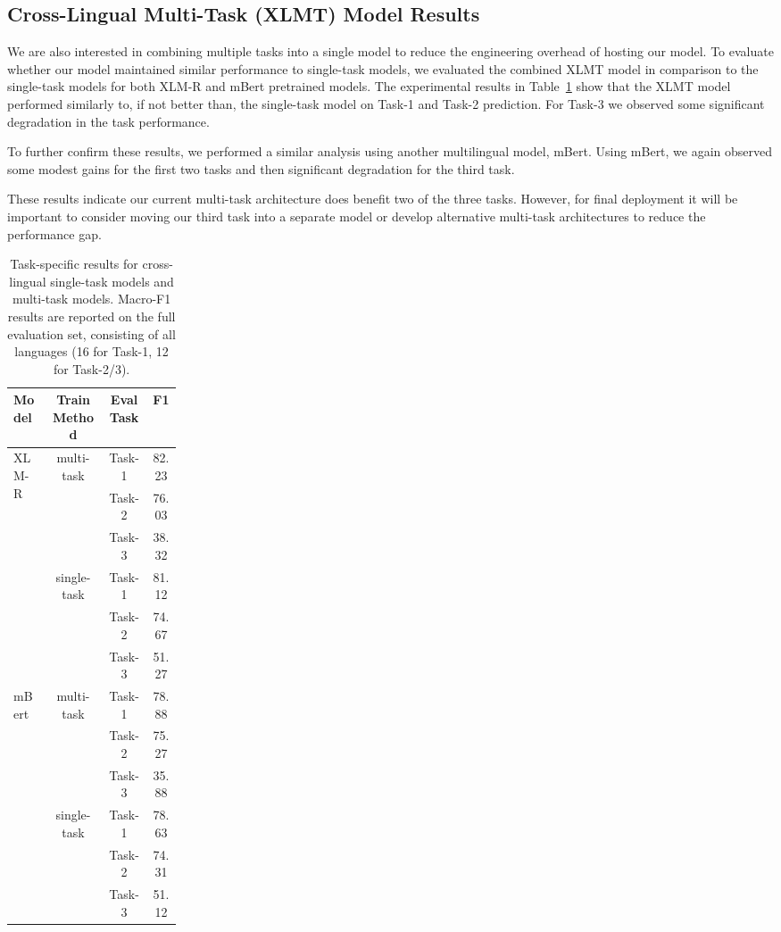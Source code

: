 \subsection*{Cross-Lingual Multi-Task (XLMT) Model Results}
We are also interested in combining multiple tasks into a single model to reduce the engineering overhead of hosting our model.
To evaluate whether our model maintained similar performance to single-task models, we evaluated the combined XLMT model in comparison to the single-task models for both XLM-R and mBert pretrained models.
The experimental results in Table~\ref{table:tasks} show that the XLMT model performed similarly to, if not better than, the single-task model on Task-1 and Task-2 prediction.
For Task-3 we observed some significant degradation in the task performance.

To further confirm these results, we performed a similar analysis using another multilingual model, mBert.
Using mBert, we again observed some modest gains for the first two tasks and then significant degradation for the third task.

These results indicate our current multi-task architecture does benefit two of the three tasks. 
However, for final deployment it will be important to consider moving our third task into a separate model or develop alternative multi-task architectures to reduce the performance gap.

\begin{table}[!htb]
\centering
\renewcommand{\arraystretch}{1.2}
\begin{tabular}{ m{0.22\linewidth}|ccc }
    \hline
    \textbf{Model} & \textbf{Train Method} & \textbf{Eval Task} & \textbf{F1} \\
    \hline
    \multirow{6}{*}{XLM-R} & \multirow{3}{*}{multi-task}& Task-1 & 82.23 \\
     &  & Task-2 & 76.03 \\
     &  & Task-3 & 38.32 \\
     \cline{2-4}
     & \multirow{3}{*}{single-task} & Task-1 & 81.12 \\
     &  & Task-2 & 74.67 \\
     &  & Task-3 & 51.27 \\
    \hline
    \multirow{6}{*}{mBert} &  \multirow{3}{*}{multi-task} & Task-1 & 78.88 \\
     &  & Task-2 & 75.27 \\
     &  & Task-3 & 35.88 \\
     \cline{2-4}
     &  \multirow{3}{*}{single-task} & Task-1 & 78.63 \\
     &  & Task-2 & 74.31 \\
     &  & Task-3 & 51.12 \\
    \hline
\end{tabular}
\caption{Task-specific results for cross-lingual single-task models and multi-task models. Macro-F1 results are reported on the full evaluation set, consisting of all languages (16 for Task-1, 12 for Task-2/3).}
\label{table:tasks}
\end{table}


